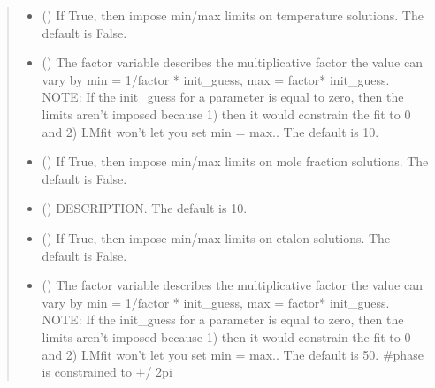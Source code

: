 \documentclass[letterpaper,10pt,english]{sphinxmanual}
\begin{document}
\begin{fulllineitems}
\begin{quote}
\begin{description}
\begin{itemize}
\item {} 
\sphinxAtStartPar
{} (\sphinxstyleliteralemphasis{\sphinxupquote{, }}) \textendash{} If True, then impose min/max limits on temperature solutions. The default is False.

\item {} 
\sphinxAtStartPar
{} (\sphinxstyleliteralemphasis{\sphinxupquote{, }}) \textendash{} The factor variable describes the multiplicative factor the value can vary by min = 1/factor * init\_guess, max = factor* init\_guess. NOTE: If the init\_guess for a parameter is equal to zero, then the limits aren’t imposed because 1) then it would constrain the fit to 0 and 2) LMfit won’t let you set min = max.. The default is 10.

\item {} 
\sphinxAtStartPar
{} (\sphinxstyleliteralemphasis{\sphinxupquote{, }}) \textendash{} If True, then impose min/max limits on mole fraction solutions. The default is False.

\item {} 
\sphinxAtStartPar
{} (\sphinxstyleliteralemphasis{\sphinxupquote{, }}) \textendash{} DESCRIPTION. The default is 10.

\item {} 
\sphinxAtStartPar
{} (\sphinxstyleliteralemphasis{\sphinxupquote{, }}) \textendash{} If True, then impose min/max limits on etalon solutions. The default is False.

\item {} 
\sphinxAtStartPar
{} (\sphinxstyleliteralemphasis{\sphinxupquote{, }}) \textendash{} The factor variable describes the multiplicative factor the value can vary by min = 1/factor * init\_guess, max = factor* init\_guess. NOTE: If the init\_guess for a parameter is equal to zero, then the limits aren’t imposed because 1) then it would constrain the fit to 0 and 2) LMfit won’t let you set min = max.. The default is 50. \#phase is constrained to +/\sphinxhyphen{} 2pi


\end{itemize}
\end{description}
\end{quote}
\end{fulllineitems}
\end{document}
